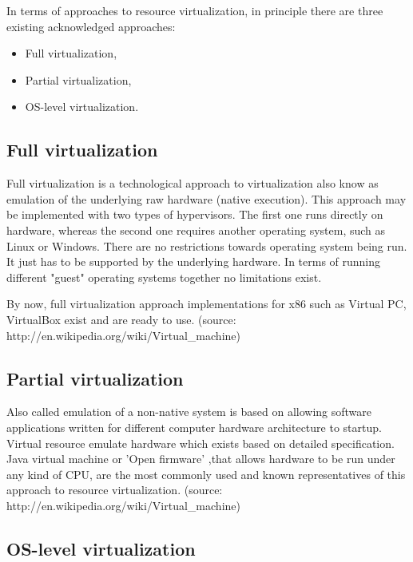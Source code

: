 \documentclass[11pt]{book}
\begin{document}
        In terms of approaches to resource virtualization, in principle there are three existing acknowledged
        approaches:

        \begin{itemize}
          \item{Full virtualization,}
          \item{Partial virtualization,}
          \item{OS-level virtualization.}
        \end{itemize}


      \subsection{Full virtualization}

        Full virtualization is a technological approach to virtualization also know as emulation of the underlying raw
        hardware (native execution). This approach may be implemented with two types of hypervisors. The first one runs
        directly on hardware, whereas the second one requires another operating system, such as Linux or Windows. There
        are no restrictions towards operating system being run. It just has to be supported by the underlying hardware.
        In terms of running different "guest" operating systems together no limitations exist.

        By now, full virtualization approach implementations for x86 such as Virtual PC, VirtualBox exist and are ready
        to use. (source: http://en.wikipedia.org/wiki/Virtual\_machine)


      \subsection{Partial virtualization}

        Also called emulation of a non-native system is based on allowing software applications written for different
        computer hardware architecture to startup. Virtual resource emulate hardware which exists based on detailed
        specification.  Java virtual machine or 'Open firmware' ,that allows hardware to be run under any kind of CPU,
        are the most commonly used and known representatives of this approach to resource virtualization. (source:
        http://en.wikipedia.org/wiki/Virtual\_machine)


      \subsection{OS-level virtualization}
\end{document}
